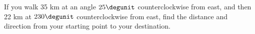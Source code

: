 If you walk 35 km at an angle $25\degunit$ counterclockwise
from east, and then 22 km at $230\degunit$ counterclockwise from
east, find the distance and direction from your starting
point to your destination.\answercheck\hwendpart
